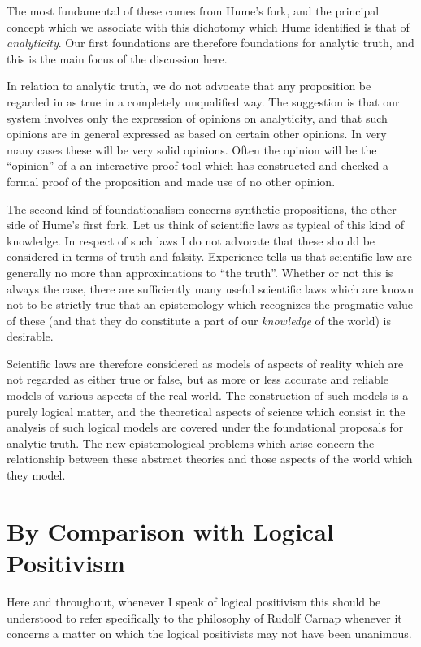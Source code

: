 The most fundamental of these comes from Hume's fork, and the
principal concept which we associate with this dichotomy which Hume
identified is that of {\it analyticity}.
Our first foundations are therefore foundations for analytic truth,
and this is the main focus of the discussion here.

In relation to analytic truth, we do not advocate that any proposition
be regarded in as true in a completely unqualified way.
The suggestion is that our system involves only the expression of
opinions on analyticity, and that such opinions are in general
expressed as based on certain other opinions.
In very many cases these will be very solid opinions.
Often the opinion will be the ``opinion'' of a an interactive proof
tool which has constructed and checked a formal proof of the
proposition and made use of no other opinion.

The second kind of foundationalism concerns synthetic propositions,
the other side of Hume's first fork.
Let us think of scientific laws as typical of this kind of knowledge.
In respect of such laws I do not advocate that these should be
considered in terms of truth and falsity.
Experience tells us that scientific law are generally no more than
approximations to ``the truth''.
Whether or not this is always the case, there are sufficiently many
useful scientific laws which are known not to be strictly true that an
epistemology which recognizes the pragmatic value of these
(and that they do constitute a part of our {\it knowledge} of the world)
is desirable.

Scientific laws are therefore considered as models of aspects of
reality which are not regarded as either true or false, but as more or
less accurate and reliable models of various aspects of the real world.
The construction of such models is a purely logical matter, and the
theoretical aspects of science which consist in the analysis of such
logical models are covered under the foundational proposals for
analytic truth.
The new epistemological problems which arise concern the relationship
between these abstract theories and those aspects of the world which
they model.

\section{By Comparison with Logical Positivism}

Here and throughout, whenever I speak of logical positivism this should
be understood to refer specifically to the philosophy of Rudolf Carnap
whenever it concerns a matter on which the logical positivists may not
have been unanimous.


